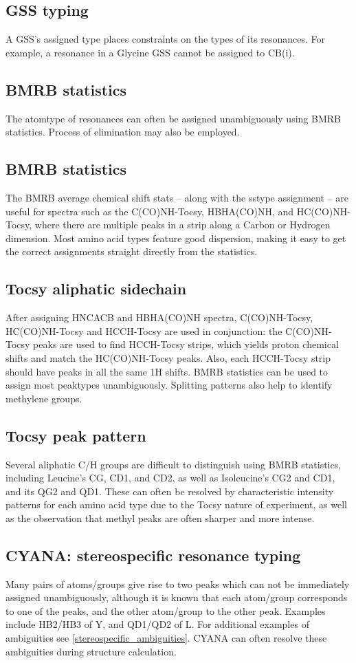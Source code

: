 \subsection*{GSS typing}
A GSS's assigned type places constraints on the types of its resonances.
For example, a resonance in a Glycine GSS cannot be assigned to CB(i).

\subsection*{BMRB statistics}
The atomtype of resonances can often be assigned unambiguously using BMRB
statistics.  Process of elimination may also be employed.

\subsection*{BMRB statistics}
The BMRB average chemical shift stats -- along with the sstype assignment -- 
are useful for spectra such as the C(CO)NH-Tocsy, HBHA(CO)NH, and 
HC(CO)NH-Tocsy, where there are multiple peaks in a strip along a Carbon or
Hydrogen dimension. Most amino acid types feature good dispersion, making it 
easy to get the correct assignments straight directly from the statistics.

\subsection*{Tocsy aliphatic sidechain}
After assigning HNCACB and HBHA(CO)NH spectra, C(CO)NH-Tocsy, HC(CO)NH-Tocsy 
and HCCH-Tocsy are used in conjunction:
the C(CO)NH-Tocsy peaks are used to find HCCH-Tocsy strips, which yields proton 
chemical shifts and match the HC(CO)NH-Tocsy peaks.  Also, each HCCH-Tocsy 
strip should have peaks in all the same 1H shifts.
BMRB statistics can be used to assign most peaktypes unambiguously.  
Splitting patterns also help to identify methylene groups.

\subsection*{Tocsy peak pattern}
Several aliphatic C/H groups are difficult to distinguish using BMRB statistics,
including Leucine's CG, CD1, and CD2, as well as Isoleucine's CG2 and CD1, and
its QG2 and QD1. These can often be resolved by characteristic intensity 
patterns for each amino acid type due to the Tocsy nature of experiment,
as well as the observation that methyl peaks are often sharper and more intense.

\subsection*{CYANA: stereospecific resonance typing}
Many pairs of atoms/groups give rise to two peaks which can not be immediately
assigned unambiguously, although it is known that each atom/group corresponds 
to one of the peaks, and the other atom/group to the other peak.
Examples include HB2/HB3 of Y, and QD1/QD2 of L.
For additional examples of ambiguities see \ref{stereospecific_ambiguities}.
CYANA can often resolve these ambiguities during structure calculation.

